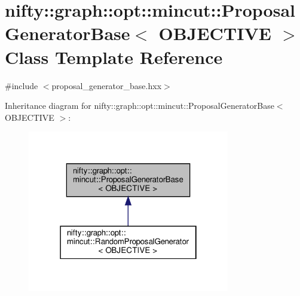 \hypertarget{classnifty_1_1graph_1_1opt_1_1mincut_1_1ProposalGeneratorBase}{}\section{nifty\+:\+:graph\+:\+:opt\+:\+:mincut\+:\+:Proposal\+Generator\+Base$<$ O\+B\+J\+E\+C\+T\+I\+VE $>$ Class Template Reference}
\label{classnifty_1_1graph_1_1opt_1_1mincut_1_1ProposalGeneratorBase}


{\ttfamily \#include $<$proposal\+\_\+generator\+\_\+base.\+hxx$>$}



Inheritance diagram for nifty\+:\+:graph\+:\+:opt\+:\+:mincut\+:\+:Proposal\+Generator\+Base$<$ O\+B\+J\+E\+C\+T\+I\+VE $>$\+:
\nopagebreak
\begin{figure}[H]
\begin{center}
\leavevmode
\includegraphics[width=250pt]{classnifty_1_1graph_1_1opt_1_1mincut_1_1ProposalGeneratorBase__inherit__graph}
\end{center}
\end{figure}
